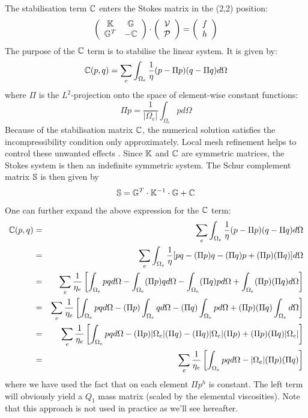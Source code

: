 The stabilisation term ${\mathbb{C}}$ enters the Stokes matrix in the (2,2) position:
\[
\left(
\begin{array}{cc}
{\mathbb{K}} & {\mathbb{G}} \\ {\mathbb{G}}^T & -{\mathbb{C}} 
\end{array}
\right)
\cdot
\left(
\begin{array}{c}
{\cal V} \\ {\cal P}
\end{array}
\right)
=
\left(
\begin{array}{c}
 f \\ h
\end{array}
\right)
\]
The purpose of the ${\mathbb{C}}$ term is to stabilise the linear system. It is given by:
\[
{\mathbb{C}}(p,q) = \sum_e \int_{\Omega_e} \frac{1}{\eta} (p-\Pi p)(q-\Pi q) d\Omega
\]
where $\Pi$ is the $L^2$-projection onto the space of element-wise constant functions:
\[
\Pi p = \frac{1}{|\Omega_e|}\int_{\Omega_e} p d\Omega
\]
Because of the stabilisation matrix ${\mathbb{C}}$, the numerical solution satisfies the incompressibility
condition only approximately. Local mesh refinement helps to control these unwanted effects
\cite{bugs09,busa13}.
Since ${\mathbb{K}}$ and ${\mathbb{C}}$ are symmetric matrices, the Stokes system is then an indefinite symmetric system.
The Schur complement matrix ${\mathbb{S}}$ is then given by 
\[
{\mathbb{S}} = {\mathbb{G}}^T \cdot {\mathbb{K}}^{-1}\cdot {\mathbb{G}} + {\mathbb{C}}
\]
One can further expand the above expression for the ${\mathbb{C}}$ term:
\begin{eqnarray}
{\mathbb{C}}(p,q) 
&=& \sum_e \int_{\Omega_e} \frac{1}{\eta} (p-\Pi p)(q-\Pi q) d\Omega \nonumber\\
&=& \sum_e \int_{\Omega_e} \frac{1}{\eta} [ pq - (\Pi p)q -(\Pi q)p + (\Pi p)(\Pi q)] d\Omega \nonumber\\
&=& \sum_e \frac{1}{\eta_e} \left[  
\int_{\Omega_e} pq   d\Omega -\int_{\Omega_e} (\Pi p)q d\Omega 
-\int_{\Omega_e} (\Pi q)p  d\Omega +  \int_{\Omega_e}   (\Pi p)(\Pi q) d\Omega \right] \nonumber\\
&=& \sum_e \frac{1}{\eta_e} \left[  
\int_{\Omega_e} pq   d\Omega - (\Pi p) \int_{\Omega_e} q d\Omega 
- (\Pi q) \int_{\Omega_e} p  d\Omega +  (\Pi p)(\Pi q)  \int_{\Omega_e}  d\Omega \right] \nonumber\\
&=& \sum_e \frac{1}{\eta_e} \left[  
\int_{\Omega_e} pq   d\Omega 
- (\Pi p) |\Omega_e| (\Pi q) 
- (\Pi q) |\Omega_e| (\Pi p) 
+ (\Pi p)(\Pi q) |\Omega_e| \right] \nonumber\\
&=& \sum_e \frac{1}{\eta_e} \left[  
\int_{\Omega_e} pq   d\Omega 
- |\Omega_e| (\Pi p) (\Pi q) 
\right]
\end{eqnarray}
where we have used the fact that on each element $\Pi p^h$ is constant. 
The left term will obviously yield a $Q_1$ mass matrix (scaled by the elemental viscosities).
Note that this approach is not used in practice as we'll see hereafter. 

